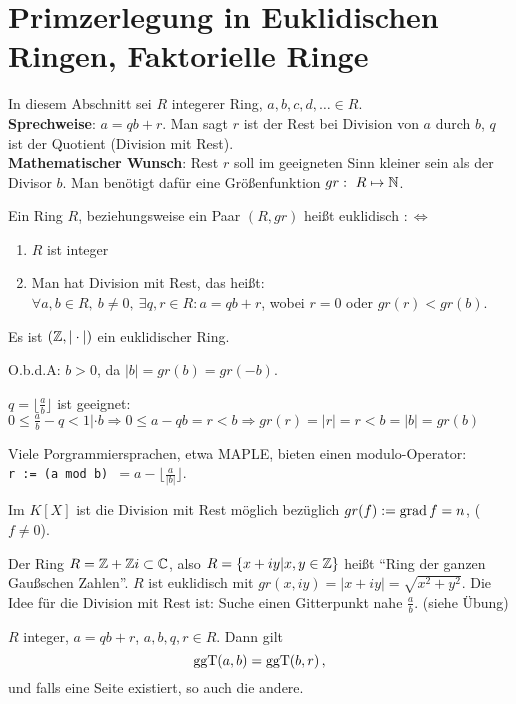 \documentclass[a4paper,twoside,DIV15,BCOR12mm]{scrbook}
\begin{document}
\section{Primzerlegung in Euklidischen Ringen, Faktorielle Ringe}
In diesem Abschnitt sei $R$ integerer Ring, $a,b,c,d,\dotsc \in
R$.\\
\textbf{Sprechweise}: $a=qb+r$. Man sagt $r$ ist der Rest bei
Division von $a$ durch $b$, $q$ ist der Quotient (Division mit
Rest).\\
\textbf{Mathematischer Wunsch}: Rest $r$ soll im geeigneten Sinn
kleiner sein als der Divisor $b$. Man benötigt dafür eine
Größenfunktion $gr:\ R\mapsto \MdN$.
\begin{definition}
    Ein Ring $R$, beziehungsweise ein Paar $(R,gr)$ heißt euklidisch
    $:\iff$
    \begin{enumerate}
        \item $R$ ist integer\\
        \item Man hat Division mit Rest, das heißt:\\ $\forall a,b \in
        R,\ b\neq 0,\ \exists q,r\in R: a=qb+r$, wobei $r=0$ oder
        $gr(r)<gr(b)$.
    \end{enumerate}
\end{definition}

Es ist $(\mathbb{Z}, |\cdot|)$ ein euklidischer Ring.
\begin{beweis}
O.b.d.A: $b>0$, da $|b| = gr(b) = gr(-b)$.

$q=\lfloor \frac a b \rfloor$ ist geeignet: $0\le \frac a b - q < 1
|\cdot b \Rightarrow 0 \le a - qb  = r < b \Rightarrow gr(r) = |r| =
r<b = |b| =gr(b)$
\end{beweis}

Viele Porgrammiersprachen, etwa MAPLE, bieten einen modulo-Operator:\\
\texttt{r := (a mod b) }$= a - \lfloor \frac a {|b|} \rfloor$.

Im $K[X]$ ist die Division mit Rest möglich bezüglich $gr(f) :=
\mathop{\rm grad}\nolimits f = n$, ($f\ne 0$).

Der Ring $R = \mathbb{Z} + \mathbb{Z} i \subset \mathbb{C}$, also $R =
\{x+iy|x,y\in\mathbb{Z}\}$ heißt "`Ring der ganzen Gaußschen Zahlen"'. $R$
ist euklidisch mit $gr(x,iy) = |x+iy| = \sqrt{x^2+y^2}$. Die Idee
für die Division mit Rest ist: Suche einen Gitterpunkt nahe $\frac a
b$. (siehe Übung)

\begin{lemma}
$R$ integer, $a= qb+r$, $a,b,q,r\in R$. Dann gilt
\[ \mathop{\rm ggT}\nolimits(a,b) = \mathop{\rm ggT}\nolimits(b,r)\,, \]
und falls eine Seite existiert, so auch die andere.
\end{lemma}
\end{document}

